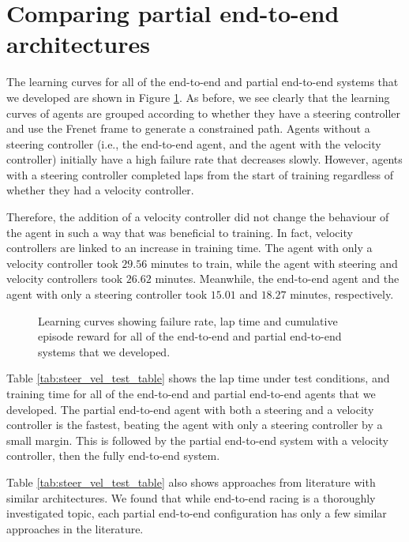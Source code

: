 \section{Comparing partial end-to-end architectures}

The learning curves for all of the end-to-end and partial end-to-end systems that we developed are shown in Figure \ref{fig:all_learning_curves}.
As before, we see clearly that the learning curves of agents are grouped according to whether they have a steering controller and use the Frenet frame to generate a constrained path.
Agents without a steering controller (i.e., the end-to-end agent, and the agent with the velocity controller) initially have a high failure rate that decreases slowly.
However, agents with a steering controller completed laps from the start of training regardless of whether they had a velocity controller.

Therefore, the addition of a velocity controller did not change the behaviour of the agent in such a way that was beneficial to training.
In fact, velocity controllers are linked to an increase in training time.
The agent with only a velocity controller took $29.56$ minutes to train, while the agent with steering and velocity controllers took $26.62$ minutes. 
Meanwhile, the end-to-end agent and the agent with only a steering controller took $15.01$ and $18.27$ minutes, respectively.

\begin{figure}[htb!]
    \centering
    
    \caption[Learning curves for all of the agents end-to-end and partial end-to-end systems]{Learning curves showing failure rate, lap time and cumulative episode reward for all of the end-to-end and partial end-to-end systems that we developed.}
    \label{fig:all_learning_curves}
\end{figure}

Table \ref{tab:steer_vel_test_table} shows the lap time under test conditions, and training time for all of the end-to-end and partial end-to-end agents that we developed.
The partial end-to-end agent with both a steering and a velocity controller is the fastest, beating the agent with only a steering controller by a small margin.
This is followed by the partial end-to-end system with a velocity controller, then the fully end-to-end system.

Table  \ref{tab:steer_vel_test_table} also shows approaches from literature with similar architectures.
We found that while end-to-end racing is a thoroughly investigated topic, each partial end-to-end configuration has only a few similar approaches in the literature.

